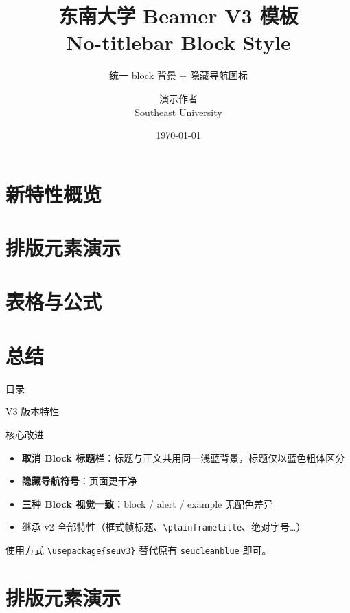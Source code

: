 \documentclass[aspectratio=169, 11pt]{beamer}
\title[V3 无标题栏模板]{东南大学 Beamer V3 模板 \\ No-titlebar Block Style}
\subtitle{统一 block 背景 + 隐藏导航图标}
\author[演示作者]{演示作者 \\ Southeast University}
\date{\today}
\begin{document}
\begin{frame}
\titlepage
\end{frame}

\section{新特性概览}
\section{排版元素演示}
\section{表格与公式}
\section{总结}

\plainframetitle
\begin{frame}{目\quad 录}
\tableofcontents
\end{frame}

\begin{frame}{V3 版本特性}

\begin{block}{核心改进}
  \begin{itemize}
    \item \textbf{取消 Block 标题栏}：标题与正文共用同一浅蓝背景，标题仅以蓝色粗体区分
    \item \textbf{隐藏导航符号}：页面更干净
    \item \textbf{三种 Block 视觉一致}：block / alert / example 无配色差异
    \item 继承 v2 全部特性（框式帧标题、\texttt{\textbackslash plainframetitle}、绝对字号…）
  \end{itemize}
\end{block}

\begin{exampleblock}{使用方式}
  \texttt{\textbackslash usepackage\{seu\textunderscore v3\}} 替代原有 \texttt{seu\textunderscore clean\textunderscore blue} 即可。
\end{exampleblock}
\end{frame}

\section{排版元素演示}
\end{document}
